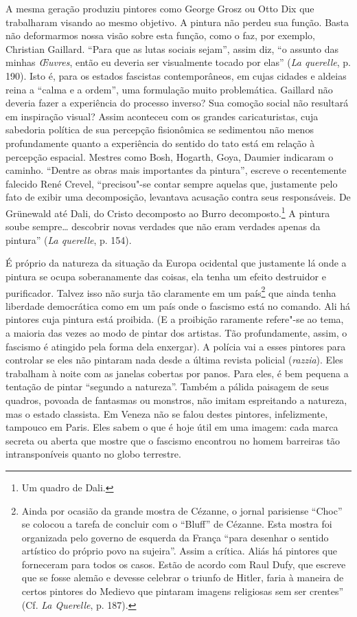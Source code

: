 A mesma geração produziu pintores como George Grosz ou Otto Dix que
trabalharam visando ao mesmo objetivo. A pintura não perdeu sua função.
Basta não deformarmos nossa visão sobre esta função, como o faz, por
exemplo, Christian Gaillard. ``Para que as lutas sociais sejam'', assim
diz, ``o assunto das minhas \emph{\OE uvres}, então eu deveria ser
visualmente tocado por elas'' (\emph{La querelle}, p. 190). Isto é, para
os estados fascistas contemporâneos, em cujas cidades e aldeias reina a
``calma e a ordem'', uma formulação muito problemática. Gaillard não
deveria fazer a experiência do processo inverso? Sua comoção social não
resultará em inspiração visual? Assim aconteceu com os grandes
caricaturistas, cuja sabedoria política de sua percepção fisionômica se
sedimentou não menos profundamente quanto a experiência do sentido do
tato está em relação à percepção espacial. Mestres como Bosh, Hogarth,
Goya, Daumier indicaram o caminho. ``Dentre as obras mais importantes da
pintura'', escreve o recentemente falecido René Crevel, ``precisou"-se
contar sempre aquelas que, justamente pelo fato de exibir uma
decomposição, levantava acusação contra seus responsáveis. De Grünewald
até Dali, do Cristo decomposto ao Burro decomposto.\footnote{Um quadro de
  Dali.} A pintura soube sempre\ldots{} descobrir novas verdades que não
eram verdades apenas da pintura'' (\emph{La querelle}, p. 154).

É próprio da natureza da situação da Europa ocidental que justamente lá
onde a pintura se ocupa soberanamente das coisas, ela tenha um efeito
destruidor e purificador. Talvez isso não surja tão claramente em um
país\footnote{Ainda por ocasião da grande mostra de Cézanne, o jornal
  parisiense ``Choc'' se colocou a tarefa de concluir com o ``Bluff'' de
  Cézanne. Esta mostra foi organizada pelo governo de esquerda da França
  ``para desenhar o sentido artístico do próprio povo na sujeira''.
  Assim a crítica. Aliás há pintores que forneceram para todos os casos.
  Estão de acordo com Raul Dufy, que escreve que se fosse alemão e
  devesse celebrar o triunfo de Hitler, faria à maneira de certos
  pintores do Medievo que pintaram imagens religiosas sem ser
  crentes'' (Cf. \emph{La Querelle}, p. 187).} que ainda tenha liberdade
democrática como em um país onde o fascismo está no comando. Ali há
pintores cuja pintura está proibida. (E a proibição raramente refere"-se
ao tema, a maioria das vezes ao modo de pintar dos artistas. Tão
profundamente, assim, o fascismo é atingido pela forma dela enxergar). A
polícia vai a esses pintores para controlar se eles não pintaram nada
desde a última revista policial (\emph{razzia}). Eles trabalham à noite
com as janelas cobertas por panos. Para eles, é bem pequena a tentação
de pintar ``segundo a natureza''. Também a pálida paisagem de seus
quadros, povoada de fantasmas ou monstros, não imitam espreitando a
natureza, mas o estado classista. Em Veneza não se falou destes
pintores, infelizmente, tampouco em Paris. Eles sabem o que é hoje útil
em uma imagem: cada marca secreta ou aberta que mostre que o fascismo
encontrou no homem barreiras tão intransponíveis quanto no globo
terrestre.
